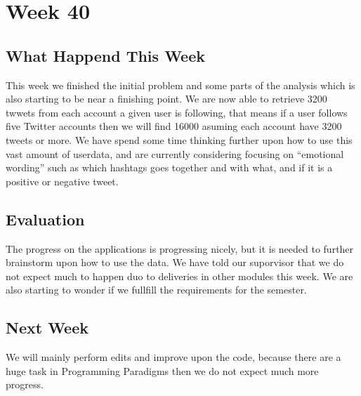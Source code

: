 \section*{Week 40}
\subsection*{What Happend This Week}
This week we finished the initial problem and some parts of the analysis which
is also starting to be near a finishing point. We are now able to retrieve 3200
twwets from each account a given user is following, that means if a user follows
five Twitter accounts then we will find 16000 asuming each account have 3200
tweets or more.
We have spend some time thinking further upon how to use this vast amount of
userdata, and are currently considering focusing on ``emotional wording'' such
as which hashtags goes together and with what, and if it is a positive or
negative tweet.

\subsection*{Evaluation}
The progress on the applications is progressing nicely, but it is needed to
further brainstorm upon how to use the data. We have told our suporvisor
that we do not expect much to happen duo to deliveries in other modules
this week. We are also starting to wonder if we fullfill the requirements for
the semester.

\subsection*{Next Week}
We will mainly perform edits and improve upon the code, because there are a huge
task in Programming Paradigms then we do not expect much more progress.




% 

